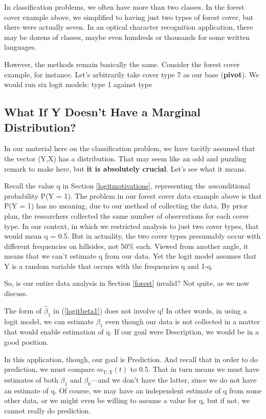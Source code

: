In classification problems, we often have more than two classes.  In the
forest cover example above, we simplified to having just two types of
forest cover, but there were actually seven.  In an optical character
recognition application, there may be dozens of classes, maybe even
hundreds or thousands for some written languages.

However, the methods remain basically the same.  Consider the forest
cover example, for instance.  Let's arbitrarily take cover type 7 as our
base ({\bf pivot}).  We would run six logit models:  type 1 against type


\subsection{What If Y Doesn't Have a Marginal Distribution?}
\label{ymarg}

In our material here on the classification problem, we have tacitly
assumed that the vector (Y,X) has a distribution.  That may seem like an
odd and puzzling remark to make here, but {\bf it is absolutely
crucial}.  Let's see what it means.

Recall the value q in Section \ref{logitmotivations}, representing the
{\it un}conditional probability P(Y = 1).  The problem in our forest
cover data example above is that P(Y = 1) has no meaning, due to our
method of collecting the data.  By prior plan, the researchers collected
the same number of observations for each cover type.  In our context, in
which we restricted analysis to just two cover types, that would mean q
= 0.5.  But in actuality, the two cover types presumably occur with
different frequencies on hillsides, not 50\% each.  Viewed from another
angle, it means that we can't estimate q from our data.  Yet the logit
model assumes that Y is a random variable that occurs with the
frequencies q and 1-q.  

So, is our entire data analysis in Section \ref{forest} invalid?  Not
quite, as we now discuss.

The form of $\widehat{\beta}_1$ in (\ref{logitbeta1}) does not involve
q!  In other words, in using a logit model, we can estimate ${\beta}_1$
even though our data is not collected in a matter that would enable
estimation of q.  If our goal were Description, we would be in a good
position.

In this application, though, our goal is Prediction.  And recall that in
order to do prediction, we must compare $m_{Y;X}(t)$ to 0.5.  That in
turn means we must have estimates of both ${\beta}_1$ and
${\beta}_0$---and we don't have the latter, since we do not have an
estimate of q.  Of course, we may have an independent estimate of q from
some other data, or we might even be willing to assume a value for q,
but if not, we cannot really do prediction.

